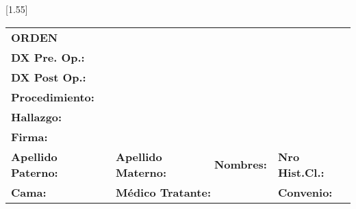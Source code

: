 \documentclass[10pt,a4paper]{article}
\begin{document}
\vspace{0.5cm}
\scalebox{1.4}[1.55]{
\begin{tabular}{|p{2.8cm}|p{2.8cm}p{2.8cm}p{2.8cm}|}
\hline
\textbf{ORDEN} & \multicolumn{3}{|l|}{}\\
\textbf{DX Pre. Op.: }&\multicolumn{3}{l|}{\begin{minipage}[t]{9 cm}\scriptsize{}\end{minipage}}\\
\textbf{DX Post Op.: }&\multicolumn{3}{l|}{\begin{minipage}[t]{9 cm}\scriptsize{}\end{minipage}}\\
\textbf{Procedimiento: }&\multicolumn{3}{l|}{\begin{minipage}[t]{9 cm}\scriptsize{}\end{minipage}}\\
\textbf{Hallazgo: }&\multicolumn{3}{l|}{\begin{minipage}[t]{9 cm}\scriptsize{}\end{minipage}}\\
\textbf{Firma: }&\multicolumn{3}{l|}{\begin{minipage}[t]{9 cm}\scriptsize{}\end{minipage}}\\
\hline
\scriptsize{\textbf{Apellido Paterno: }} &\scriptsize{\textbf{Apellido Materno: }}&\scriptsize{\textbf{Nombres: }}&\scriptsize{\textbf{Nro Hist.Cl.:}}\\
\hline
\scriptsize{\textbf{Cama: }}& \multicolumn{2}{l}{\begin{minipage}[t]{5.5 cm}\scriptsize{\textbf{M\'edico Tratante: }}\end{minipage}} &\scriptsize{\textbf{Convenio: }}\\

\hline
\end{tabular}}
\end{document}
